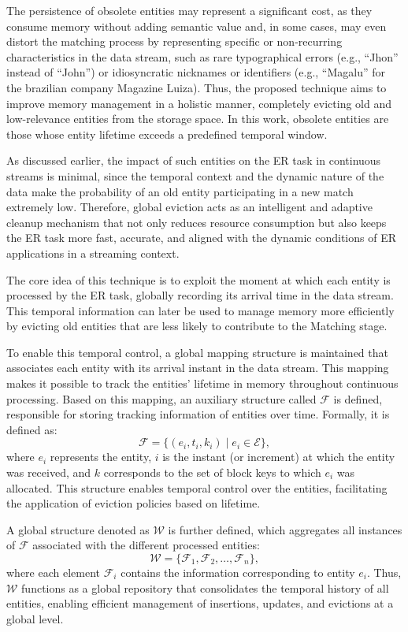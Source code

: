 \documentclass{ieeeaccess}
\begin{document}
The persistence of obsolete entities may represent a significant cost, as they consume memory without adding semantic value and, in some cases, may even distort the matching process by representing specific or non-recurring characteristics in the data stream, such as rare typographical errors (e.g., ``Jhon'' instead of ``John'') or idiosyncratic nicknames or identifiers (e.g., ``Magalu'' for the brazilian company Magazine Luiza). Thus, the proposed technique aims to improve memory management in a holistic manner, completely evicting old and low-relevance entities from the storage space. In this work, obsolete entities are those whose entity lifetime exceeds a predefined temporal window.

As discussed earlier, the impact of such entities on the ER task in continuous streams is minimal, since the temporal context and the dynamic nature of the data make the probability of an old entity participating in a new match extremely low. Therefore, global eviction acts as an intelligent and adaptive cleanup mechanism that not only reduces resource consumption but also keeps the ER task more fast, accurate, and aligned with the dynamic conditions of ER applications in a streaming context.

The core idea of this technique is to exploit the moment at which each entity is processed by the ER task, globally recording its arrival time in the data stream. This temporal information can later be used to manage memory more efficiently by evicting old entities that are less likely to contribute to the Matching stage.

To enable this temporal control, a global mapping structure is maintained that associates each entity with its arrival instant in the data stream. This mapping makes it possible to track the entities’ lifetime in memory throughout continuous processing. Based on this mapping, an auxiliary structure called \( \mathcal{F} \) is defined, responsible for storing tracking information of entities over time. Formally, it is defined as:
\[
\mathcal{F} = \{ (e_i, t_i, k_i) \mid e_i \in \mathcal{E} \},
\]
where \( e_i \) represents the entity, \( i \) is the instant (or increment) at which the entity was received, and \( k \) corresponds to the set of block keys to which \( e_i \) was allocated. This structure enables temporal control over the entities, facilitating the application of eviction policies based on lifetime.

A global structure denoted as \( \mathcal{W} \) is further defined, which aggregates all instances of \( \mathcal{F} \) associated with the different processed entities:
\[
\mathcal{W} = \{ \mathcal{F}_1, \mathcal{F}_2, \dots, \mathcal{F}_n \},
\]
where each element \( \mathcal{F}_i \) contains the information corresponding to entity \( e_i \). Thus, \( \mathcal{W} \) functions as a global repository that consolidates the temporal history of all entities, enabling efficient management of insertions, updates, and evictions at a global level.
\end{document}
